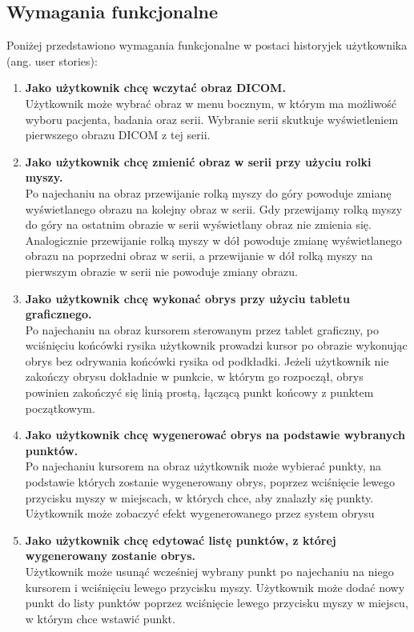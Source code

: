 \documentclass[a4paper,11pt,twoside]{report}
\theoremstyle{definition}
\begin{document}
\subsection {Wymagania funkcjonalne}

Poniżej przedstawiono wymagania funkcjonalne w postaci historyjek użytkownika (ang. user stories): 
\begin{enumerate}
\item \textbf {Jako użytkownik chcę wczytać obraz DICOM.} \\
Użytkownik może wybrać obraz w menu bocznym, w którym ma możliwość wyboru pacjenta, badania oraz serii. Wybranie serii skutkuje wyświetleniem pierwszego obrazu DICOM z tej serii.

\item \textbf {Jako użytkownik chcę zmienić obraz w serii przy użyciu rolki myszy.} \\
Po najechaniu na obraz przewijanie rolką myszy do góry powoduje zmianę wyświetlanego obrazu na kolejny obraz w serii. Gdy przewijamy rolką myszy do góry na ostatnim obrazie w serii wyświetlany obraz nie zmienia się. Analogicznie przewijanie rolką myszy w dół powoduje zmianę wyświetlanego obrazu na poprzedni obraz w serii, a przewijanie w dół rolką myszy na pierwszym obrazie w serii nie powoduje zmiany obrazu.

\item \textbf {Jako użytkownik chcę wykonać obrys przy użyciu tabletu graficznego.} \\
Po najechaniu na obraz kursorem sterowanym przez tablet graficzny, po wciśnięciu końcówki rysika użytkownik prowadzi kursor po obrazie wykonując obrys bez odrywania końcówki rysika od podkładki. Jeżeli użytkownik nie zakończy obrysu dokładnie w punkcie, w którym go rozpoczął, obrys powinien zakończyć się linią prostą, łączącą punkt końcowy z punktem początkowym.

\item \textbf {Jako użytkownik chcę wygenerować obrys na podstawie wybranych punktów.} \\
Po najechaniu kursorem na obraz użytkownik może wybierać punkty, na podstawie których zostanie wygenerowany obrys, poprzez wciśnięcie lewego przycisku myszy w miejscach, w których chce, aby znalazły się punkty. Użytkownik może zobaczyć efekt wygenerowanego przez system obrysu

\item \textbf {Jako użytkownik chcę edytować listę punktów, z której wygenerowany zostanie obrys.} \\
Użytkownik może usunąć wcześniej wybrany punkt po najechaniu na niego kursorem i wciśnięciu lewego przycisku myszy. Użytkownik może dodać nowy punkt do listy punktów poprzez wciśnięcie lewego przycisku myszy w miejscu, w którym chce wstawić punkt.


\end{enumerate}
\end{document}
